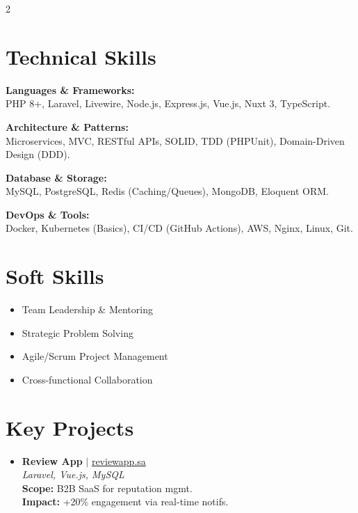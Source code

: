 \documentclass[10pt, a4paper]{article}
\begin{document}
\begin{paracol}{2}
\section{Technical Skills}
\begin{itemize}[leftmargin=0.15in, label={}, itemsep=4pt]
    \small{
     \item \textbf{Languages \& Frameworks:} \\ PHP 8+, Laravel, Livewire, Node.js, Express.js, Vue.js, Nuxt 3, TypeScript.
     \item \textbf{Architecture \& Patterns:} \\ Microservices, MVC, RESTful APIs, SOLID, TDD (PHPUnit), Domain-Driven Design (DDD).
     \item \textbf{Database \& Storage:} \\ MySQL, PostgreSQL, Redis (Caching/Queues), MongoDB, Eloquent ORM.
     \item \textbf{DevOps \& Tools:} \\ Docker, Kubernetes (Basics), CI/CD (GitHub Actions), AWS, Nginx, Linux, Git.
    }
\end{itemize}

\section{Soft Skills}
\begin{itemize}[leftmargin=0.15in, label={}, itemsep=3pt]
    \small
    \item Team Leadership \& Mentoring
    \item Strategic Problem Solving
    \item Agile/Scrum Project Management
    \item Cross-functional Collaboration
\end{itemize}

\section{Key Projects}
\begin{itemize}[leftmargin=0.15in, label={}]
    \item \textbf{Review App} $|$ \href{https://reviewapp.sa/}{reviewapp.sa} \\
    \footnotesize \textit{Laravel, Vue.js, MySQL} \\
    \textbf{Scope:} B2B SaaS for reputation mgmt. \\
    \textbf{Impact:} +20\% engagement via real-time notifs.
    \vspace{6pt}
    

\end{itemize}
\end{paracol}
\end{document}
